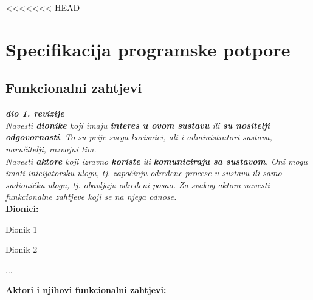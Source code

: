<<<<<<< HEAD
\chapter{Specifikacija programske potpore}
\usepackage{graphicx}
		
	\section{Funkcionalni zahtjevi}
			
			\textbf{\textit{dio 1. revizije}}\\
			
			\textit{Navesti \textbf{dionike} koji imaju \textbf{interes u ovom sustavu} ili  \textbf{su nositelji odgovornosti}. To su prije svega korisnici, ali i administratori sustava, naručitelji, razvojni tim.}\\
				
			\textit{Navesti \textbf{aktore} koji izravno \textbf{koriste} ili \textbf{komuniciraju sa sustavom}. Oni mogu imati inicijatorsku ulogu, tj. započinju određene procese u sustavu ili samo sudioničku ulogu, tj. obavljaju određeni posao. Za svakog aktora navesti funkcionalne zahtjeve koji se na njega odnose.}\\
			
			
			\noindent \textbf{Dionici:}
			
			\begin{packed_enum}
				
				\item Dionik 1
				\item Dionik 2				
				\item ...
				
			\end{packed_enum}
			
			\noindent \textbf{Aktori i njihovi funkcionalni zahtjevi:}
			
